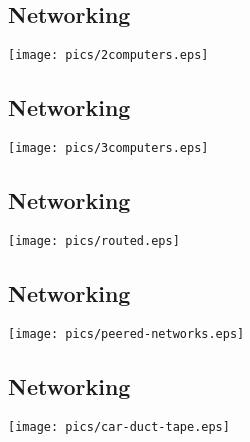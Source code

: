 \documentclass[xga]{xdvislides}
\begin{document}
\subsection{Networking}
\vspace*{\fill}
\begin{center}
	\texttt{[image: pics/2computers.eps]} \\
\end{center}
\vspace*{\fill}

\subsection{Networking}
\vspace*{\fill}
\begin{center}
	\texttt{[image: pics/3computers.eps]} \\
\end{center}
\vspace*{\fill}

\subsection{Networking}
\vspace*{\fill}
\begin{center}
	\texttt{[image: pics/routed.eps]} \\
\end{center}
\vspace*{\fill}

\subsection{Networking}
\vspace*{\fill}
\begin{center}
	\texttt{[image: pics/peered-networks.eps]} \\
\end{center}
\vspace*{\fill}

\subsection{Networking}
\vspace*{\fill}
\begin{center}
	\texttt{[image: pics/car-duct-tape.eps]} \\
\end{center}
\vspace*{\fill}
\end{document}

